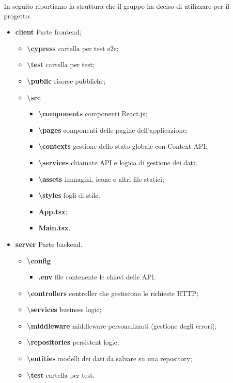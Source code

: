 In seguito riportiamo la struttura che il gruppo ha deciso di utilizzare per il progetto:
\begin{itemize}
    \item \textbf{client} Parte frontend;
    \begin{itemize}
        \item \textbf{\textbackslash cypress} cartella per test e2e;
        \item \textbf{\textbackslash test} cartella per test;
        \item \textbf{\textbackslash public} risorse pubbliche;
        \item \textbf{\textbackslash src}
        \begin{itemize}
            \item \textbf{\textbackslash components} componenti React.js;
            \item \textbf{\textbackslash pages} componenti delle pagine dell'applicazione;
            \item \textbf{\textbackslash contexts} gestione dello stato globale con Context API;
            \item \textbf{\textbackslash services} chiamate API e logica di gestione dei dati;
            \item \textbf{\textbackslash assets} immagini, icone e altri file statici;
            \item \textbf{\textbackslash styles} fogli di stile.
            \item \textbf{App.tsx};
            \item \textbf{Main.tsx}.
        \end{itemize}
    \end{itemize}
    \item \textbf{server} Parte backend.
    \begin{itemize}
        \item \textbf{\textbackslash config}
        \begin{itemize}
            \item \textbf{.env } file contenente le chiavi delle API.
        \end{itemize}
        \item \textbf{\textbackslash controllers} controller che gestiscono le richieste HTTP;
        \item \textbf{\textbackslash services} business logic;
        \item \textbf{\textbackslash middleware} middleware personalizzati (gestione degli errori);
        \item \textbf{\textbackslash repositories} persistent logic;
        \item \textbf{\textbackslash entities} modelli dei dati da salvare su una repository;
        \item \textbf{\textbackslash test} cartella per test.
    \end{itemize}
\end{itemize}


